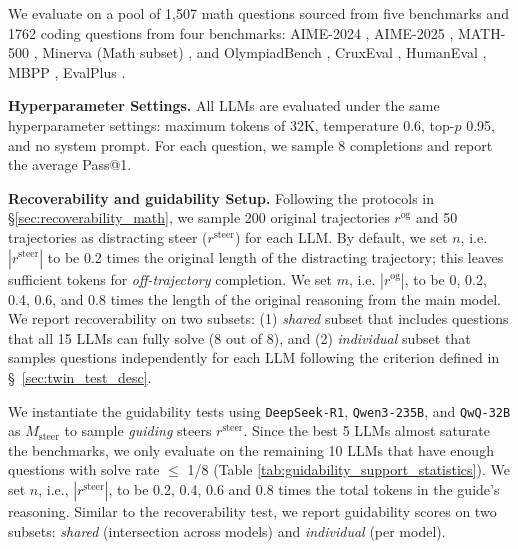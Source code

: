 \documentclass{article} %
\begin{document}
We evaluate on a pool of 1,507 math questions sourced from five benchmarks and 1762 coding questions from four benchmarks: AIME-2024 \citep{maa2024aime}, AIME-2025 \citep{maa2025aime}, MATH-500 \citep{hendrycks2021measuring}, Minerva (Math subset) \citep{lewkowycz2022solving}, and OlympiadBench \citep{he-etal-2024-olympiadbench}, CruxEval \citep{gu2024cruxeval}, HumanEval \citep{chen2021evaluating}, MBPP \citep{austin2021program}, EvalPlus \citep{liu2023your}.

\textbf{Hyperparameter Settings.} All LLMs are evaluated under the same hyperparameter settings: maximum tokens of 32K, temperature 0.6, top-$p$ 0.95, and no system prompt. For each question, we sample 8 completions and report the average Pass@1.

\textbf{Recoverability and guidability Setup.} Following the protocols in \S \ref{sec:recoverability_math}, we sample 200 original trajectories $r^\mathrm{og}$ and  50 trajectories as distracting steer ($r^\mathrm{steer}$) for each LLM. By default, we set $n$, i.e. $|r^\mathrm{steer}|$ to be 0.2 times the original length of the distracting trajectory; this leaves sufficient tokens for \textit{off-trajectory} completion. We set $m$, i.e. $|r^\mathrm{og}|$, to be 0, 0.2, 0.4, 0.6, and 0.8 times the length of the original reasoning from the main model. We report recoverability on two subsets: (1) \textit{shared} subset that includes questions that   all 15 LLMs can fully solve (8 out of 8), and (2) \textit{individual} subset that samples questions independently for each LLM following the criterion defined in \S~\ref{sec:twin_test_desc}.

We instantiate the guidability tests using \texttt{DeepSeek-R1}, \texttt{Qwen3-235B}, and \texttt{QwQ-32B} as $M_\mathrm{steer}$ to sample \textit{guiding} steers $r^\mathrm{steer}$. Since the best 5 LLMs almost saturate the benchmarks, we only evaluate on the remaining 10 LLMs that have enough questions with solve rate $\leq$ 1/8 (Table \ref{tab:guidability_support_statistics}). We set $n$, i.e., $|r^\mathrm{steer}|$,  to be 0.2, 0.4, 0.6 and 0.8 times the total tokens in the guide's reasoning. Similar to the recoverability test, we report guidability scores on two subsets: \textit{shared} (intersection across models) and \textit{individual} (per model).
\end{document}
